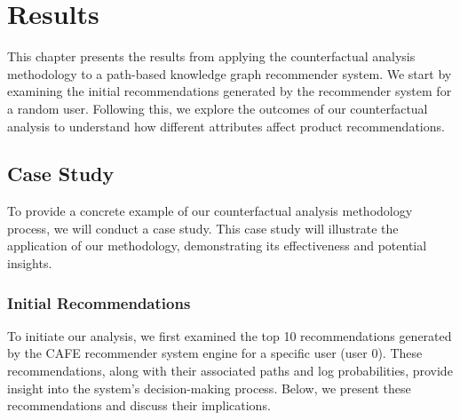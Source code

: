 \chapter{Results}\label{chap:results}

This chapter presents the results from applying the counterfactual analysis
methodology to a path-based knowledge graph recommender system. We start by examining
the initial recommendations generated by the recommender system for a random user.
Following this, we explore the outcomes of our counterfactual analysis
to understand how different attributes affect product recommendations.

\section{Case Study}
To provide a concrete example of our counterfactual analysis methodology process,
we will conduct a case study. This case study will
illustrate the application of our methodology, demonstrating its effectiveness and
potential insights.


\subsection{Initial Recommendations}
To initiate our analysis, we first examined the top 10 recommendations generated
by the CAFE recommender system engine for a specific user (user 0). These recommendations,
along with their associated paths and log probabilities, provide insight into the system's
decision-making process. Below, we present these recommendations and discuss their
implications.

